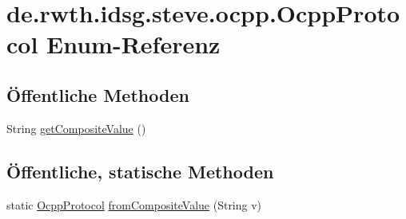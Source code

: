 \hypertarget{enumde_1_1rwth_1_1idsg_1_1steve_1_1ocpp_1_1_ocpp_protocol}{\section{de.\-rwth.\-idsg.\-steve.\-ocpp.\-Ocpp\-Protocol Enum-\/\-Referenz}
\label{enumde_1_1rwth_1_1idsg_1_1steve_1_1ocpp_1_1_ocpp_protocol}
}
\subsection*{Öffentliche Methoden}
\begin{DoxyCompactItemize}
\item 
String \hyperlink{enumde_1_1rwth_1_1idsg_1_1steve_1_1ocpp_1_1_ocpp_protocol_a95bc56bd40e0d2aa1935989a762e5501}{get\-Composite\-Value} ()
\end{DoxyCompactItemize}
\subsection*{Öffentliche, statische Methoden}
\begin{DoxyCompactItemize}
\item 
static \hyperlink{enumde_1_1rwth_1_1idsg_1_1steve_1_1ocpp_1_1_ocpp_protocol}{Ocpp\-Protocol} \hyperlink{enumde_1_1rwth_1_1idsg_1_1steve_1_1ocpp_1_1_ocpp_protocol_a002d2764bec30b836401b582a689feeb}{from\-Composite\-Value} (String v)
\end{DoxyCompactItemize}
